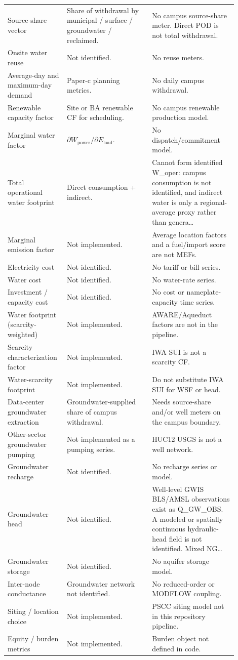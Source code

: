 \documentclass[11pt]{article}
\begin{document}
\begin{longtable}{@{}p{0.20\linewidth}p{0.35\linewidth}p{0.35\linewidth}@{}}
Source-share vector & Share of withdrawal by municipal / surface / groundwater / reclaimed. & No campus source-share meter. Direct POD is not total withdrawal.\\
Onsite water reuse & Not identified. & No reuse meters.\\
Average-day and maximum-day demand & Paper-c planning metrics. & No daily campus withdrawal.\\
Renewable capacity factor & Site or BA renewable CF for scheduling. & No campus renewable production model.\\
Marginal water factor & $\partial W_{\mathrm{power}} / \partial E_{\mathrm{load}}$. & No dispatch/commitment model.\\
Total operational water footprint & Direct consumption + indirect. & Cannot form identified W\_oper: campus consumption is not identified, and indirect water is only a regional-average proxy rather than genera\ldots\\
Marginal emission factor & Not implemented. & Average location factors and a fuel/import score are not MEFs.\\
Electricity cost & Not identified. & No tariff or bill series.\\
Water cost & Not identified. & No water-rate series.\\
Investment / capacity cost & Not identified. & No cost or nameplate-capacity time series.\\
Water footprint (scarcity-weighted) & Not implemented. & AWARE/Aqueduct factors are not in the pipeline.\\
Scarcity characterization factor & Not implemented. & IWA SUI is not a scarcity CF.\\
Water-scarcity footprint & Not implemented. & Do not substitute IWA SUI for WSF or head.\\
Data-center groundwater extraction & Groundwater-supplied share of campus withdrawal. & Needs source-share and/or well meters on the campus boundary.\\
Other-sector groundwater pumping & Not implemented as a pumping series. & HUC12 USGS is not a well network.\\
Groundwater recharge & Not identified. & No recharge series or model.\\
Groundwater head & Not identified. & Well-level GWIS BLS/AMSL observations exist as Q\_GW\_OBS. A modeled or spatially continuous hydraulic-head field is not identified. Mixed NG\ldots\\
Groundwater storage & Not identified. & No aquifer storage model.\\
Inter-node conductance & Groundwater network not identified. & No reduced-order or MODFLOW coupling.\\
Siting / location choice & Not implemented. & PSCC siting model not in this repository pipeline.\\
Equity / burden metrics & Not implemented. & Burden object not defined in code.\\
\end{longtable}
\endgroup
\end{document}
